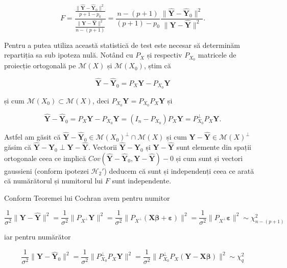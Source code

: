 \documentclass[]{article}
\begin{document}
\[
  F = \frac{\frac{\lVert\hat{\boldsymbol Y} - \hat{\boldsymbol Y}_0\rVert^2}{p+1-p_0}}{\frac{\lVert\boldsymbol Y - \hat{\boldsymbol Y}\rVert^2}{n - (p+1)}} = \frac{n - (p+1)}{(p+1) - p_0}\frac{\lVert\hat{\boldsymbol Y} - \hat{\boldsymbol Y}_0\rVert^2}{\lVert\boldsymbol Y - \hat{\boldsymbol Y}\rVert^2}.
\]

Pentru a putea utiliza această statistică de test este necesar să
determinăm repartiția sa sub ipoteza nulă. Notând cu \(P_X\) și
respectiv \(P_{X_0}\) matricele de proiecție ortogonală pe
\(\mathcal{M}(X)\) și \(\mathcal{M}(X_0)\), știm că

\[
  \hat{\boldsymbol Y} - \hat{\boldsymbol Y}_0 = P_X\boldsymbol Y - P_{X_{0}}\boldsymbol Y
\]

și cum \(\mathcal{M}(X_0)\subset \mathcal{M}(X)\), deci
\(P_{X_0}\boldsymbol Y = P_{X_0}P_{X}\boldsymbol Y\) și

\[
  \hat{\boldsymbol Y} - \hat{\boldsymbol Y}_0 = P_{X}\boldsymbol Y -  P_{X_0}\boldsymbol Y =  (I_n - P_{X_0})P_X\boldsymbol Y = P_{X_0}^\perp P_{X}\boldsymbol Y.
\]

Astfel am găsit că
\(\hat{\boldsymbol Y} - \hat{\boldsymbol Y}_0\in\mathcal{M}(X_0)^\perp\cap \mathcal{M}(X)\)
și cum \(\boldsymbol Y - \hat{\boldsymbol Y}\in\mathcal{M}(X)^\perp\)
găsim că
\(\hat{\boldsymbol Y} - \hat{\boldsymbol Y}_0 \perp \boldsymbol Y - \hat{\boldsymbol Y}\).
Vectorii \(\hat{\boldsymbol Y} - \hat{\boldsymbol Y}_0\) și
\(\boldsymbol Y - \hat{\boldsymbol Y}\) sunt elemente din spații
ortogonale ceea ce implică
\(Cov(\hat{\boldsymbol Y} - \hat{\boldsymbol Y}_0, \boldsymbol Y - \hat{\boldsymbol Y}) - 0\)
și cum sunt și vectori gaussieni (conform ipotezei \(\mathcal{H}_2'\))
deducem că sunt și independenți ceea ce arată că numărătorul și
numitorul lui \(F\) sunt independente.

Conform Teoremei lui Cochran avem pentru numitor

\[ 
  \frac{1}{\sigma^2}\lVert\boldsymbol Y - \hat{\boldsymbol Y}\rVert^2 = \frac{1}{\sigma^2}\lVert P_{X^\perp}\boldsymbol Y\rVert^2 = \frac{1}{\sigma^2}\lVert P_{X^\perp}(\boldsymbol X\boldsymbol\beta + \boldsymbol\varepsilon)\rVert^2 = \frac{1}{\sigma^2}\lVert P_{X^\perp}\boldsymbol\varepsilon\rVert^2\sim\chi^2_{n - (p+1)}
\]

iar pentru numărător

\[
\frac{1}{\sigma^2}\lVert\hat{\boldsymbol Y} - \hat{\boldsymbol Y}_0\rVert^2 = \frac{1}{\sigma^2}\lVert P_{X_0}^\perp P_{X}\boldsymbol Y\rVert^2 = \frac{1}{\sigma^2}\lVert P_{X_0}^\perp P_{X}(\boldsymbol Y - \boldsymbol X\boldsymbol\beta)\rVert^2 \sim \chi^2_{q}
\]
\end{document}
